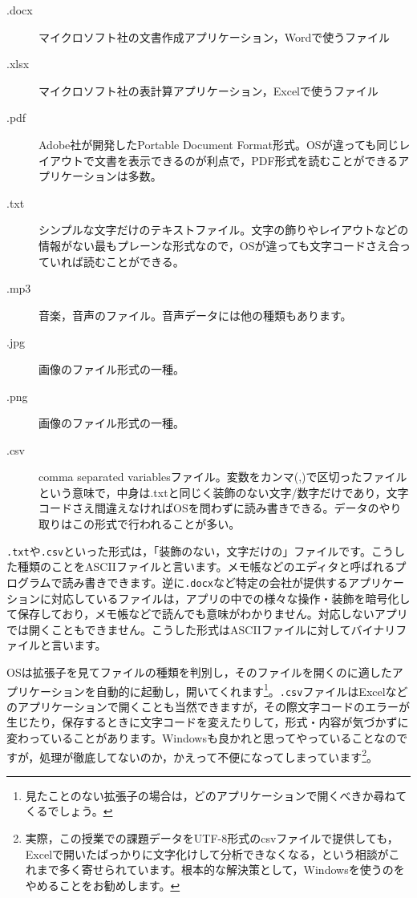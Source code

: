 \documentclass{ltjsbook}
\begin{document}
\begin{description}
	\item[.docx] マイクロソフト社の文書作成アプリケーション，Wordで使うファイル
	\item[.xlsx] マイクロソフト社の表計算アプリケーション，Excelで使うファイル
	\item[.pdf]  Adobe社が開発したPortable Document Format形式。OSが違っても同じレイアウトで文書を表示できるのが利点で，PDF形式を読むことができるアプリケーションは多数。
	\item[.txt] シンプルな文字だけのテキストファイル。文字の飾りやレイアウトなどの情報がない最もプレーンな形式なので，OSが違っても文字コードさえ合っていれば読むことができる。
	\item[.mp3] 音楽，音声のファイル。音声データには他の種類もあります。
	\item[.jpg] 画像のファイル形式の一種。
	\item[.png] 画像のファイル形式の一種。
	\item[.csv]  comma separated variablesファイル。変数をカンマ(,)で区切ったファイルという意味で，中身は.txtと同じく装飾のない文字/数字だけであり，文字コードさえ間違えなければOSを問わずに読み書きできる。データのやり取りはこの形式で行われることが多い。
\end{description}
\texttt{.txt}や\texttt{.csv}といった形式は，「装飾のない，文字だけの」ファイルです。こうした種類のことをASCIIファイルと言います。メモ帳などのエディタと呼ばれるプログラムで読み書きできます。逆に\texttt{.docx}など特定の会社が提供するアプリケーションに対応しているファイルは，アプリの中での様々な操作・装飾を暗号化して保存しており，メモ帳などで読んでも意味がわかりません。対応しないアプリでは開くこともできません。こうした形式はASCIIファイルに対してバイナリファイルと言います。

OSは拡張子を見てファイルの種類を判別し，そのファイルを開くのに適したアプリケーションを自動的に起動し，開いてくれます\footnote{見たことのない拡張子の場合は，どのアプリケーションで開くべきか尋ねてくるでしょう。}。\texttt{.csv}ファイルはExcelなどのアプリケーションで開くことも当然できますが，その際文字コードのエラーが生じたり，保存するときに文字コードを変えたりして，形式・内容が気づかずに変わっていることがあります。Windowsも良かれと思ってやっていることなのですが，処理が徹底してないのか，かえって不便になってしまっています\footnote{実際，この授業での課題データをUTF-8形式のcsvファイルで提供しても，Excelで開いたばっかりに文字化けして分析できなくなる，という相談がこれまで多く寄せられています。根本的な解決策として，Windowsを使うのをやめることをお勧めします。}。
\end{document}
